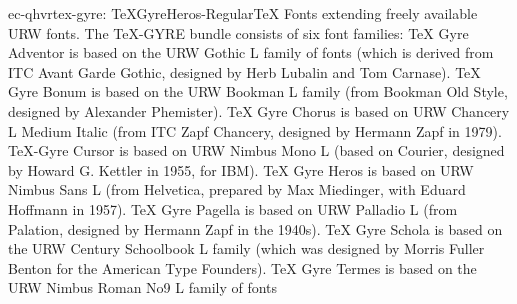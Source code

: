 \documentclass{ddltxtyp}
\begin{document}
\begin{package}{ec-qhvr}{tex-gyre: TeXGyreHeros-Regular}{{\TeX} Fonts extending freely available URW fonts.}
The {\TeX}-GYRE bundle consists of six font families: {\TeX} Gyre
Adventor is based on the URW Gothic L family of fonts (which is
derived from ITC Avant Garde Gothic, designed by Herb Lubalin
and Tom Carnase). {\TeX} Gyre Bonum is based on the URW Bookman L
family (from Bookman Old Style, designed by Alexander
Phemister). {\TeX} Gyre Chorus is based on URW Chancery L Medium
Italic (from ITC Zapf Chancery, designed by Hermann Zapf in
1979). {\TeX}-Gyre Cursor is based on URW Nimbus Mono L (based on
Courier, designed by Howard G. Kettler in 1955, for IBM). {\TeX}
Gyre Heros is based on URW Nimbus Sans L (from Helvetica,
prepared by Max Miedinger, with Eduard Hoffmann in 1957). {\TeX}
Gyre Pagella is based on URW Palladio L (from Palation,
designed by Hermann Zapf in the 1940s). {\TeX} Gyre Schola is
based on the URW Century Schoolbook L family (which was
designed by Morris Fuller Benton for the American Type
Founders). {\TeX} Gyre Termes is based on the URW Nimbus Roman No9
L family of fonts %
\end{package}
\end{document}
